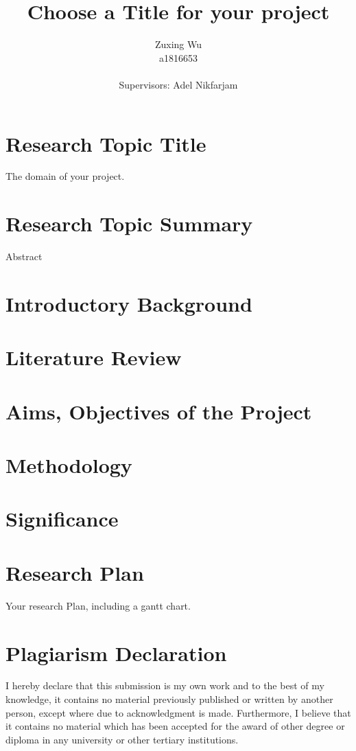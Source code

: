 \documentclass[]{article}
\title{Choose a Title for your project}
\author{Zuxing Wu\\a1816653\\ \\Supervisors: Adel Nikfarjam\\ }
\begin{document}
\maketitle\nonumber

\newpage\nonumber

\tableofcontents

\newpage

\section{Research Topic Title} 
The domain of your project.
\section{Research Topic Summary}

Abstract

\section{Introductory Background}


\section{Literature Review}

\section{Aims, Objectives of the Project}

\section{Methodology}

\section{Significance}
     

\section{Research Plan}
Your research Plan, including a gantt chart. 


\section{Plagiarism Declaration}
I hereby declare that this submission is my own work and to the best of my knowledge, it contains no material previously published or written by another person, except where due to acknowledgment is made. Furthermore, I believe that it contains no material which has been accepted for the award of other degree or diploma in any university or other tertiary institutions.




\end{document}
